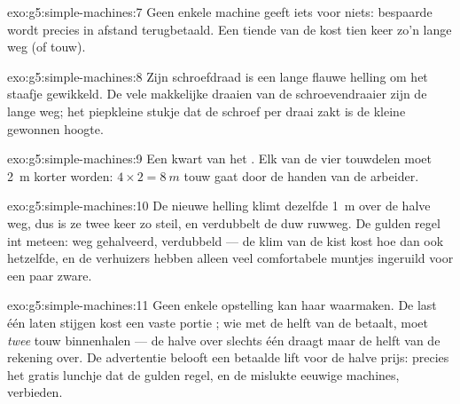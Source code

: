\begin{solution}{exo:g5:simple-machines:7}
Geen enkele machine geeft iets voor niets: bespaarde  wordt
precies in afstand terugbetaald. Een tiende van de  kost tien
keer zo'n lange weg (of touw).
\end{solution}

\begin{solution}{exo:g5:simple-machines:8}
Zijn schroefdraad is een lange flauwe helling om het staafje
gewikkeld. De vele makkelijke draaien van de schroevendraaier zijn de
lange weg; het piepkleine stukje dat de schroef per draai zakt is de
kleine gewonnen hoogte.
\end{solution}

\begin{solution}{exo:g5:simple-machines:9}
Een kwart van het . Elk van de vier touwdelen moet \qty{2}{m}
korter worden: $4 \times 2 = \qty{8}{m}$ touw gaat door de handen van
de arbeider.
\end{solution}

\begin{solution}{exo:g5:simple-machines:10}
De nieuwe helling klimt dezelfde \qty{1}{m} over de halve weg, dus is
ze twee keer zo steil, en verdubbelt de duw ruwweg. De gulden regel
int meteen: weg gehalveerd,  verdubbeld --- de klim van de kist
kost hoe dan ook hetzelfde, en de verhuizers hebben alleen veel
comfortabele muntjes ingeruild voor een paar zware.
\end{solution}

\begin{solution}{exo:g5:simple-machines:11}
Geen enkele opstelling kan haar waarmaken. De last één  laten
stijgen kost een vaste portie ; wie met de helft van de
 betaalt, moet \emph{twee}  touw binnenhalen --- de
halve  over slechts één  draagt maar de helft van de
rekening over. De advertentie belooft een betaalde lift voor de halve
prijs: precies het gratis lunchje dat de gulden regel, en de mislukte
eeuwige machines, verbieden.
\end{solution}
